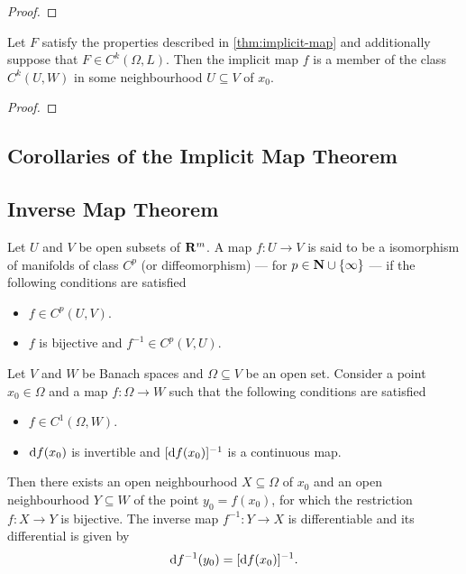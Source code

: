 \begin{proof}

\end{proof}

\begin{lemma}
    \label{lem:Ck-implicit-map}
    Let \(F\) satisfy the properties described in \cref{thm:implicit-map} and
    additionally suppose that \(F \in C^k(\Omega, L)\). Then the implicit map \(f\) is
    a member of the class \(C^k(U, W)\) in some neighbourhood \(U \subseteq V\) of \(x_0\).
\end{lemma}

\begin{proof}

\end{proof}


\subsection{Corollaries of the Implicit Map Theorem}

\subsection{Inverse Map Theorem}

\begin{definition}[Diffeomorphisms]
    \label{def:diffeormorphism-on-R}
    Let \(U\) and \(V\) be open subsets of \(\mathbf{R}^m\). A map \(f: U \to V\) is said to
    be a isomorphism of manifolds of class \(C^p\) (or diffeomorphism) --- for \(p \in
    \mathbf{N} \cup \{\infty\}\) --- if the following conditions are satisfied
    \begin{itemize}\setlength\itemsep{0em}
        \item \(f \in C^p(U, V)\).
        \item \(f\) is bijective and \(f^{-1} \in C^p(V, U)\).
    \end{itemize}
\end{definition}

\begin{theorem}
    \label{thm:inverse-map}
    Let \(V\) and \(W\) be Banach spaces and \(\Omega \subseteq V\) be an open
    set. Consider a point \(x_0 \in \Omega\) and a map \(f: \Omega \to W\) such that the
    following conditions are satisfied
    \begin{itemize}\setlength\itemsep{0em}
        \item \(f \in C^1(\Omega, W)\).
        \item \(\mathrm{d} f(x_0)\) is invertible and \([\mathrm{d} f(x_{0})]^{-1}\) is a
              continuous map.
    \end{itemize}
    Then there exists an open neighbourhood \(X \subseteq \Omega\) of \(x_0\) and an open
    neighbourhood \(Y \subseteq W\) of the point \(y_0 = f(x_0)\), for which the
    restriction \(f: X \to Y\) is bijective. The inverse map \(f^{-1}: Y \to X\)
    is differentiable and its differential is given by
    \[
        \mathrm{d} f^{-1}(y_0) = [\mathrm{d} f(x_{0})]^{-1}.
    \]
\end{theorem}

